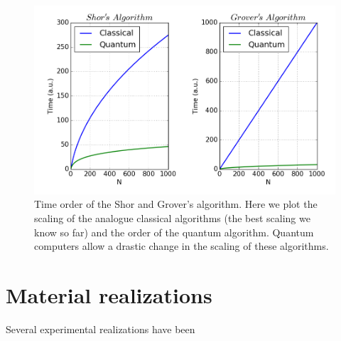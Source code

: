 \begin{figure}[!h]
  \centering
  \includegraphics{chapter02/figures/quantum_scaling.png}
  \vspace{-5pt}
  \caption{Time order of the Shor and Grover's algorithm. Here we plot the scaling of the analogue classical algorithms (the best scaling we know so far) and the order of the quantum algorithm. Quantum computers allow a drastic change in the scaling of these algorithms.}
\end{figure}
\FloatBarrier


\section{Material realizations}
Several experimental realizations have been
